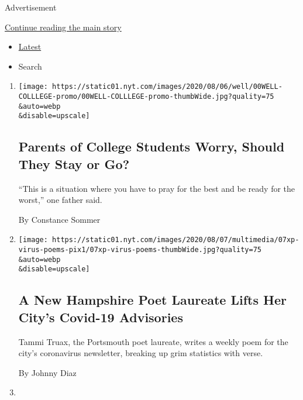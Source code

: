 Advertisement

\protect\hyperlink{after-mid2}{Continue reading the main story}

\begin{itemize}
\tightlist
\item
  \protect\hyperlink{stream-panel}{Latest}
\item
  Search
\end{itemize}

\begin{enumerate}
\def\labelenumi{\arabic{enumi}.}
\item
  \href{/2020/08/07/well/family/college-students-coronavirus-parents-back-to-school.html}{}

  \texttt{[image: https://static01.nyt.com/images/2020/08/06/well/00WELL-COLLLEGE-promo/00WELL-COLLLEGE-promo-thumbWide.jpg?quality=75\\\&auto=webp\\\&disable=upscale]}

  \hypertarget{parents-of-college-students-worry-should-they-stay-or-go}{%
  \subsection{Parents of College Students Worry, Should They Stay or
  Go?}\label{parents-of-college-students-worry-should-they-stay-or-go}}

  ``This is a situation where you have to pray for the best and be ready
  for the worst,'' one father said.

  By Constance Sommer
\item
  \href{/2020/08/07/us/portsmouth-nh-newsletter-poems.html}{}

  \texttt{[image: https://static01.nyt.com/images/2020/08/07/multimedia/07xp-virus-poems-pix1/07xp-virus-poems-thumbWide.jpg?quality=75\\\&auto=webp\\\&disable=upscale]}

  \hypertarget{a-new-hampshire-poet-laureate-lifts-her-citys-covid-19-advisories}{%
  \subsection{A New Hampshire Poet Laureate Lifts Her City's Covid-19
  Advisories}\label{a-new-hampshire-poet-laureate-lifts-her-citys-covid-19-advisories}}

  Tammi Truax, the Portsmouth poet laureate, writes a weekly poem for
  the city's coronavirus newsletter, breaking up grim statistics with
  verse.

  By Johnny Diaz
\item
  \href{/2020/08/07/world/covid-19-news.html}{}


\end{enumerate}
